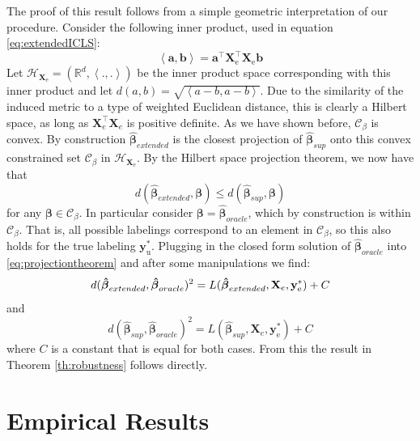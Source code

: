 \documentclass{llncs}
\newcommand{\Xe}{\mathbf{X}_e  }
\newcommand{\XeT}{\mathbf{X}_e^{\top}}
\newcommand{\Cb}{\mathcal{C}_{\beta}}
\begin{document}
The proof of this result follows from a simple geometric interpretation of our procedure. Consider the following inner product, used in equation \eqref{eq:extendedICLS}:
\begin{equation}
\left\langle \mathbf{a}, \mathbf{b} \right\rangle = \mathbf{a}^\top \mathbf{X}_\text{e}^\top \mathbf{X}_\text{e} \mathbf{b}
\end{equation}
Let $\mathcal{H}_{\mathbf{X}_\text{e}} = ( \mathbb{R}^d,\left\langle ., . \right\rangle )$ be the inner product space corresponding with this inner product and let $d(a,b)=\sqrt{\left\langle a-b, a-b \right\rangle}$. Due to the similarity of the induced metric to a type of weighted Euclidean distance, this is clearly a Hilbert space, as long as $\XeT \Xe$ is positive definite. As we have shown before, $\Cb$ is convex. By construction $\boldsymbol{\hat{\beta}}_{extended}$ is the closest projection of $\boldsymbol{\hat{\beta}}_{sup}$ onto this convex constrained set $\Cb$ in $\mathcal{H}_{\mathbf{X}_\text{e}}$. By the Hilbert space projection theorem, we now have that 
\begin{equation}
\label{eq:projectiontheorem}
d(\boldsymbol{\hat{\beta}}_{extended},\boldsymbol{\beta}) \leq d(\boldsymbol{\hat{\beta}}_{sup},\boldsymbol{\beta})
\end{equation}
for any $\boldsymbol{\beta} \in \Cb$. In particular consider $\boldsymbol{\beta}=\boldsymbol{\hat{\beta}}_{oracle}$, which by construction is within $\Cb$. That is, all possible labelings correspond to an element in $\Cb$, so this also holds for the true labeling $\mathbf{y}_\text{u}^\ast$. Plugging in the closed form solution of $\boldsymbol{\hat{\beta}}_{oracle}$ into \eqref{eq:projectiontheorem} and after some manipulations we find:
\begin{equation}
d(\boldsymbol{\hat{\beta}}_{extended},\boldsymbol{\hat{\beta}}_{oracle})^2=L(\boldsymbol{\hat{\beta}}_{extended},\Xe,\mathbf{y}_\text{e}^{\ast})+C \\ \nonumber
\end{equation}
and
\begin{equation}
d(\boldsymbol{\hat{\beta}}_{sup},\boldsymbol{\hat{\beta}}_{oracle})^2=L(\boldsymbol{\hat{\beta}}_{sup},\Xe,\mathbf{y}_\text{e}^{\ast})+C \nonumber
\end{equation} 
where $C$ is a constant that is equal for both cases. From this the result in Theorem \ref{th:robustness} follows directly.


\section{Empirical Results} \label{section:empiricalresults}
\end{document}
